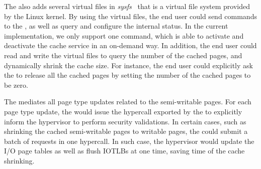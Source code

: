 The \cache also adds several virtual files in \emph{sysfs}~\cite{love2004linux,mochel2005sysfs} that is a virtual file system provided by the Linux kernel.
By using the virtual files, the end user could send commands to the \cache,  as well as query and configure the internal status.
In the current implementation, we only support one command, which is able to activate and deactivate the cache service in an on-demand way.
In addition, the end user could read and write the virtual files to query the number of the cached pages, and dynamically shrink the cache size.
For instance, the end user could explicitly ask the \cache to release all the cached pages by setting the number of the cached pages to be zero.

The \cache mediates all page type updates related to the semi-writable pages.
For each page type update, the \cache would issue the hypercall exported by the \module to explicitly inform the hypervisor to perform security validations.
In certain cases, such as shrinking the cached semi-writable pages to writable pages, the \cache could submit a batch of requests in one hypercall.
In such case, the hypervisor would update the I/O page tables as well as flush IOTLBs at one time, saving time of the cache shrinking.







